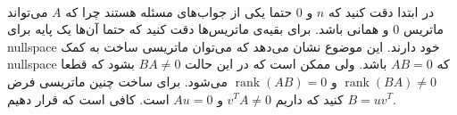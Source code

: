 \\
در ابتدا دقت کنید که
$n$
و 0
حتما یکی از جواب‌های مسئله هستند چرا که
$A$
می‌تواند ماتریس 0 و همانی باشد.
برای بقیه‌ی ماتریس‌ها دقت کنید که حتما آن‌ها یک پایه برای
nullspace
خود دارند. این موضوع نشان می‌دهد که می‌توان ماتریسی ساخت به کمک
nullspace
که
$AB = 0$
باشد. ولی ممکن است که در این حالت
$BA \neq 0$
بشود که قطعا
$\operatorname{rank}(BA) \neq 0$
و
$\operatorname{rank}(AB) = 0$
می‌شود.
برای ساخت چنین ماتریسی فرض کنید که داریم
$v^TA \neq 0$
و
$Au = 0$
است. کافی است که قرار دهیم
$B = uv^T$.

